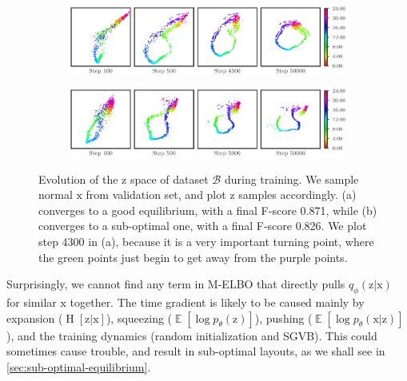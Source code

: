 \documentclass[sigconf]{acmart}
\newcommand{\DATASETB}{$\mathcal{B}$}
\newcommand{\vv}[1]{\bm{\mathrm{{#1}}}}
\newcommand{\EE}[1]{\operatorname{\mathbb{E}}\left[{#1}\right]}
\newcommand{\Entropyy}[1]{\operatorname{H}\left[#1\right]}
\begin{document}
\begin{figure}
	\begin{subfigure}[t]{\columnwidth}
		\centering
		\includegraphics[width=\columnwidth]{z2_dynamic_latent_space}
		\caption{}\label{fig:training-dynamics-good}
	\end{subfigure}
	\begin{subfigure}[t]{\columnwidth}
		\centering
		\includegraphics[width=\columnwidth]{z2_dynamic_latent_space_failed}
		\caption{}\label{fig:training-dynamics-bad}
	\end{subfigure}
	\caption{
		Evolution of the $\vv{z}$ space of dataset \DATASETB{} during training.
		We sample normal $\vv{x}$ from validation set, and plot $\vv{z}$ samples accordingly.
		(a) converges to a good equilibrium, with a final F-score 0.871, while (b) converges to a sub-optimal one, with a final F-score 0.826.
		We plot step 4300 in (a), because it is a very important turning point, where the green points just begin to get away from the purple points.
	}
	\label{fig:training-dynamics}
\end{figure}

Surprisingly, we cannot find any term in M-ELBO that directly pulls $q_{\phi}(\vv{z}|\vv{x})$ for similar $\vv{x}$ together.
The time gradient is likely to be caused mainly by expansion ($\Entropyy{\vv{z}|\vv{x}}$), squeezing ($\EE{\log p_{\theta}(\vv{z})}$), pushing ($\EE{\log p_{\theta}(\vv{x}|\vv{z})}$), and the training dynamics (random initialization and SGVB).
This could sometimes cause trouble, and result in sub-optimal layouts, as we shall see in \cref{sec:sub-optimal-equilibrium}.

\end{document}

